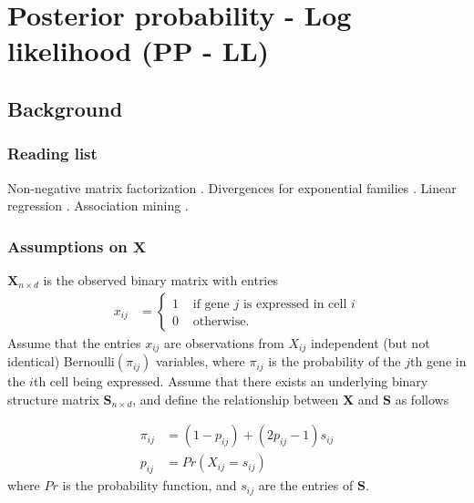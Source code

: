 \documentclass[12pt]{article}
\begin{document}
\newcommand{\cpos}{\text{\scriptsize{{\it POS}}}}
\newcommand{\cneg}{\text{\scriptsize{{\it NEG}}}}
\newcommand{\mb}{\mathbf}

\section{Posterior probability - Log likelihood (PP - LL)} \label{sec:loglik} %

\subsection{Background} 

\subsubsection*{Reading list} %
Non-negative matrix factorization \cite{Lee1999Learning}. 
Divergences for exponential families \cite{Banerjee2005Clustering}.
Linear regression  \cite[ch 12.3]{Casella2002Statistical}.  
Association mining \cite{Agrawal1993Mining}.

\subsubsection*{Assumptions on $\mathbf{X}$} %

$\mathbf{X}_{n \times d}$ is the observed binary matrix with entries
\begin{align}
  x_{ij} &= 
  \begin{cases}
   1 &  \text{ if gene $j$ is expressed in cell $i$} \\
   0 & \text{ otherwise.}
  \end{cases}
\end{align}
Assume that the entries $x_{ij}$ are observations from $X_{ij}$  independent (but not identical) Bernoulli$(\pi_{ij})$ variables, where $\pi_{ij}$ is the probability of the $j$th gene in the $i$th cell being expressed. 
Assume that there exists an underlying binary structure matrix $\mathbf{S}_{n \times d}$, and define the relationship between  $\mathbf{X}$ and  $\mathbf{S}$ as follows

\begin{align} \label{eg: Xassumptions}
   \pi_{ij} &= (1 -  p_{ij}) + (2  p_{ij} - 1) s_{ij} \\
   p_{ij} & =  Pr(X_{ij} = s_{ij}) \nonumber
\end{align}
where $Pr$ is the probability function, and $s_{ij}$ are the entries of $\mathbf{S}$.
\end{document}
